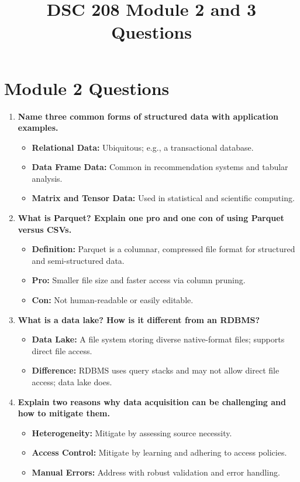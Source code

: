 \documentclass[12pt]{article}
\title{DSC 208 Module 2 and 3 Questions}
\author{}
\date{}
\begin{document}
\maketitle

\section*{Module 2 Questions}

\begin{enumerate}
    \item \textbf{Name three common forms of structured data with application examples.}
    \begin{itemize}
        \item \textbf{Relational Data:} Ubiquitous; e.g., a transactional database.
        \item \textbf{Data Frame Data:} Common in recommendation systems and tabular analysis.
        \item \textbf{Matrix and Tensor Data:} Used in statistical and scientific computing.
    \end{itemize}

    \item \textbf{What is Parquet? Explain one pro and one con of using Parquet versus CSVs.}
    \begin{itemize}
        \item \textbf{Definition:} Parquet is a columnar, compressed file format for structured and semi-structured data.
        \item \textbf{Pro:} Smaller file size and faster access via column pruning.
        \item \textbf{Con:} Not human-readable or easily editable.
    \end{itemize}

    \item \textbf{What is a data lake? How is it different from an RDBMS?}
    \begin{itemize}
        \item \textbf{Data Lake:} A file system storing diverse native-format files; supports direct file access.
        \item \textbf{Difference:} RDBMS uses query stacks and may not allow direct file access; data lake does.
    \end{itemize}

    \item \textbf{Explain two reasons why data acquisition can be challenging and how to mitigate them.}
    \begin{itemize}
        \item \textbf{Heterogeneity:} Mitigate by assessing source necessity.
        \item \textbf{Access Control:} Mitigate by learning and adhering to access policies.
        \item \textbf{Manual Errors:} Address with robust validation and error handling.
    \end{itemize}


\end{enumerate}
\end{document}
